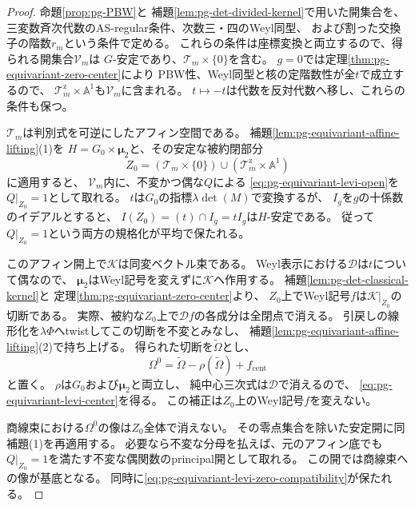 \begin{proof}
命題\ref{prop:pg-PBW}と
補題\ref{lem:pg-det-divided-kernel}で用いた開集合を、
三変数斉次代数のAS-regular条件、次数三・四のWeyl同型、
および割った交換子の階数$r_m$という条件で定める。
これらの条件は座標変換と両立するので、得られる開集合$\mathcal V_m$は
$G$-安定であり、$\mathcal T_m\times\{0\}$を含む。
$g=0$では定理\ref{thm:pg-equivariant-zero-center}により
PBW性、Weyl同型と核の定階数性が全$t$で成立するので、
$\mathcal T_m^{\mathrm z}\times\mathbb A^1$も$\mathcal V_m$に含まれる。
$t\mapsto-t$は代数を反対代数へ移し、これらの条件も保つ。

$\mathcal T_m$は判別式を可逆にしたアフィン空間である。
補題\ref{lem:pg-equivariant-affine-lifting}(1)を
$H=G_0\times\boldsymbol\mu_2$と、その安定な被約閉部分
\begin{equation}
 Z_0=(\mathcal T_m\times\{0\})\cup
     (\mathcal T_m^{\mathrm z}\times\mathbb A^1)
 \label{eq:pg-equivariant-levi-prescribed-locus}
\end{equation}
に適用すると、
$\mathcal V_m$内に、不変かつ偶な$Q$による
\eqref{eq:pg-equivariant-levi-open}を$Q|_{Z_0}=1$として取れる。
$t$は$G_0$の指標$\lambda\det(M)$で変換するが、
$I_g$を$g$の十係数のイデアルとすると、
$I(Z_0)=(t)\cap I_g=tI_g$は$H$-安定である。
従って$Q|_{Z_0}=1$という両方の規格化が平均で保たれる。

このアフィン開上で$\mathcal K$は同変ベクトル束である。
Weyl表示における$\mathcal D$は$t$について偶なので、
$\boldsymbol\mu_2$はWeyl記号を変えずに$\mathcal K$へ作用する。
補題\ref{lem:pg-det-classical-kernel}と
定理\ref{thm:pg-equivariant-zero-center}より、
$Z_0$上でWeyl記号$f$は$\mathcal K|_{Z_0}$の切断である。
実際、被約な$Z_0$上で$\mathcal Df$の各成分は全閉点で消える。
引戻しの線形化を$\lambda\Phi$へtwistしてこの切断を不変とみなし、
補題\ref{lem:pg-equivariant-affine-lifting}(2)で持ち上げる。
得られた切断を$\widetilde\Omega$とし、
\begin{equation}
 \Omega^0=\widetilde\Omega-\rho(\widetilde\Omega)+f_{\mathrm{cent}}
 \label{eq:pg-equivariant-pure-center-adjustment}
\end{equation}
と置く。
$\rho$は$G_0$および$\boldsymbol\mu_2$と両立し、
純中心三次式は$\mathcal D$で消えるので、
\eqref{eq:pg-equivariant-levi-center}を得る。
この補正は$Z_0$上のWeyl記号$f$を変えない。

商線束における$\Omega^0$の像は$Z_0$全体で消えない。
その零点集合を除いた安定開に同補題(1)を再適用する。
必要なら不変な分母を払えば、元のアフィン底でも
$Q|_{Z_0}=1$を満たす不変な偶関数のprincipal開として取れる。
この開では商線束への像が基底となる。
同時に\eqref{eq:pg-equivariant-levi-zero-compatibility}が保たれる。
\end{proof}

